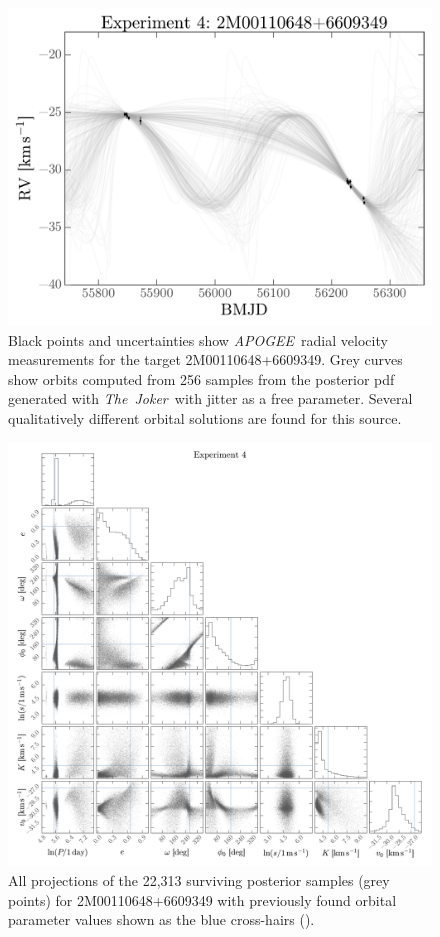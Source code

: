 \documentclass[manuscript, letterpaper]{aastex6}
\newcommand{\project}[1]{\textsl{#1}}
\newcommand{\acronym}[1]{{\small{#1}}}
\newcommand{\apogee}{\project{\acronym{APOGEE}}}
\newcommand{\samplername}{\project{The~Joker}}
\begin{document}
\begin{figure}[p]
\begin{center}
\includegraphics[width=\textwidth]{figures/apogee-rv-curves.pdf}
\end{center}
\caption{%
Black points and uncertainties show \apogee\ radial velocity measurements for
the target 2M00110648+6609349.
Grey curves show orbits computed from 256 samples from the posterior pdf
generated with \samplername\ with jitter as a free parameter.
Several qualitatively different orbital solutions are found for this source.
\label{fig:apogee-rv}}
\end{figure}

\begin{figure}[p]
\begin{center}
\includegraphics[width=\textwidth]{figures/apogee-corner.pdf}
\end{center}
\caption{%
All projections of the 22,313 surviving posterior samples (grey points)
for 2M00110648+6609349 with
previously found orbital parameter values shown as the blue cross-hairs
(\citealt{Troup:2016}).
\label{fig:apogee-corner}}
\end{figure}
\end{document}
